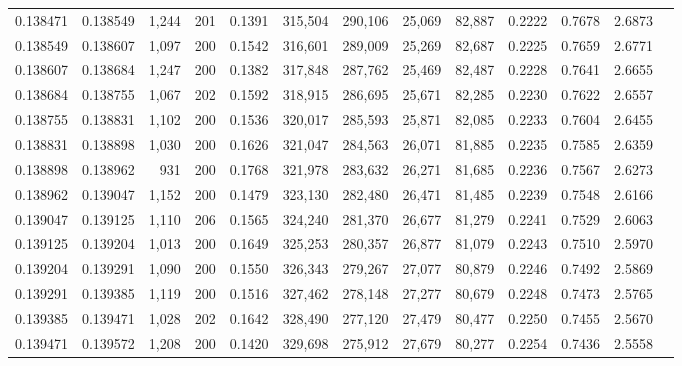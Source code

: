 \begin{tabular}{rrrrrrrrrrrrr}
0.138471 & 0.138549 &  1,244 & 201 &                                     0.1391 & 315,504 & 290,106 &  25,069 &  82,887 & 0.2222 & 0.7678 & 2.6873 \\
0.138549 & 0.138607 &  1,097 & 200 &                                     0.1542 & 316,601 & 289,009 &  25,269 &  82,687 & 0.2225 & 0.7659 & 2.6771 \\
0.138607 & 0.138684 &  1,247 & 200 &                                     0.1382 & 317,848 & 287,762 &  25,469 &  82,487 & 0.2228 & 0.7641 & 2.6655 \\
0.138684 & 0.138755 &  1,067 & 202 &                                     0.1592 & 318,915 & 286,695 &  25,671 &  82,285 & 0.2230 & 0.7622 & 2.6557 \\
0.138755 & 0.138831 &  1,102 & 200 &                                     0.1536 & 320,017 & 285,593 &  25,871 &  82,085 & 0.2233 & 0.7604 & 2.6455 \\
0.138831 & 0.138898 &  1,030 & 200 &                                     0.1626 & 321,047 & 284,563 &  26,071 &  81,885 & 0.2235 & 0.7585 & 2.6359 \\
0.138898 & 0.138962 &    931 & 200 &                                     0.1768 & 321,978 & 283,632 &  26,271 &  81,685 & 0.2236 & 0.7567 & 2.6273 \\
0.138962 & 0.139047 &  1,152 & 200 &                                     0.1479 & 323,130 & 282,480 &  26,471 &  81,485 & 0.2239 & 0.7548 & 2.6166 \\
0.139047 & 0.139125 &  1,110 & 206 &                                     0.1565 & 324,240 & 281,370 &  26,677 &  81,279 & 0.2241 & 0.7529 & 2.6063 \\
0.139125 & 0.139204 &  1,013 & 200 &                                     0.1649 & 325,253 & 280,357 &  26,877 &  81,079 & 0.2243 & 0.7510 & 2.5970 \\
0.139204 & 0.139291 &  1,090 & 200 &                                     0.1550 & 326,343 & 279,267 &  27,077 &  80,879 & 0.2246 & 0.7492 & 2.5869 \\
0.139291 & 0.139385 &  1,119 & 200 &                                     0.1516 & 327,462 & 278,148 &  27,277 &  80,679 & 0.2248 & 0.7473 & 2.5765 \\
0.139385 & 0.139471 &  1,028 & 202 &                                     0.1642 & 328,490 & 277,120 &  27,479 &  80,477 & 0.2250 & 0.7455 & 2.5670 \\
0.139471 & 0.139572 &  1,208 & 200 &                                     0.1420 & 329,698 & 275,912 &  27,679 &  80,277 & 0.2254 & 0.7436 & 2.5558 \\

\end{tabular}
